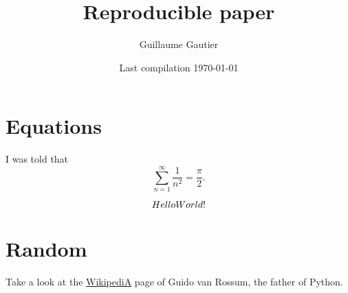\documentclass{article}
\begin{document}

\title{Reproducible paper}

\author{Guillaume Gautier}

\date{ Last compilation \today }

\maketitle




\section{Equations} %
\label{sec:equations}

	I was told that
	\begin{equation}
		\sum_{n=1}^{\infty} \frac{1}{n^2} = \frac{\pi}{2}.
	\end{equation}

	\begin{equation}
		Hello World!
	\end{equation}


\section{Random} %
\label{sec:random}

	Take a look at the \href{https://en.wikipedia.org/wiki/Linus_Torvalds}{WikipediA} page of Guido van Rossum, the father of Python.

\end{document}
